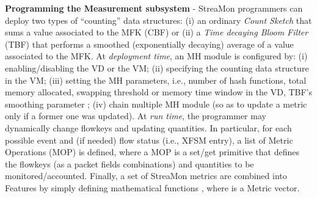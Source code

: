\documentclass[conference,letterpaper]{sig-alternate-10pt}
\begin{document}
\textbf{Programming the Measurement subsystem} - StreaMon programmers can deploy two types of ``counting'' data structures: (i) an ordinary \emph{Count Sketch} that sums a value associated to the MFK (CBF) or (ii) a \emph{Time decaying Bloom Filter} (TBF) \cite{ccr11Bianchi} that performs a smoothed (exponentially decaying) average of a value associated to the MFK. At {\em deployment time}, an MH module is configured by: (i) enabling/disabling the VD or the VM; (ii) specifying the counting data structure in the VM; (iii) setting the MH parameters, i.e., number of hash functions, total memory allocated, swapping threshold \cite{info10Bianchi} or memory time window in the VD, TBF's smoothing parameter \cite{ccr11Bianchi}; (iv) chain multiple MH module (so as to update a metric only if a former one was updated). At {\em run time}, the programmer may dynamically change flowkeys and updating quantities.  In particular, for each possible event and (if needed) flow status (i.e., XFSM entry), a list of Metric Operations (MOP) is defined, where a MOP is a set/get primitive that defines the flowkeys (as a packet fields combinations) and quantities to be monitored/accounted. Finally, a set of StreaMon metrics are combined into Features by simply defining mathematical functions , where  is a Metric vector.
\end{document}
